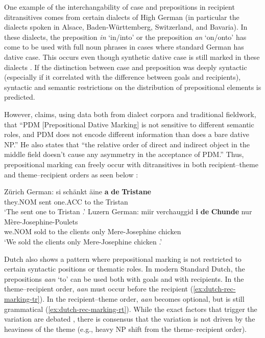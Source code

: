 	One example of the interchangability of case and prepositions in recipient ditransitives comes from certain dialects of High German (in particular the dialects spoken in Alsace, Baden-Württemberg, Switzerland, and Bavaria). In these dialects, the preposition \textit{in} `in/into' or the preposition \textit{an} `on/onto' has come to be used with full noun phrases in cases where standard German has dative case. This occurs even though synthetic dative case is still marked in these dialects \citep{Seiler.2001,Seiler.2003}. If the distinction between case and preposition was deeply syntactic (especially if it correlated with the difference between goals and recipients), syntactic and semantic restrictions on the distribution of prepositional elements is predicted. 
	
	However, \cite{Seiler.2001} claims, using data both from dialect corpora and traditional fieldwork, that ``PDM [Prepositional Dative Marking] is not sensitive to different semantic roles, and PDM does not encode different information than does a bare dative NP.'' He also states that ``the relative order of direct and indirect object in the middle field doesn't cause any asymmetry in the acceptance of PDM.'' Thus, prepositional marking can freely occur with ditransitives in both recipient--theme and theme--recipient orders as seen below \citep{Seiler.2001,Seiler.2003}:
	\begin{exe}
		\ex Zürich German:\label{ex:zurich}
		\gll si schänkt äine \textbf{a} \textbf{de} \textbf{Tristane}\\
		they.NOM sent one.ACC to the Tristan\\
		\trans `The sent one to Tristan \citep[pg. 175]{Seiler.2003}.'
		\ex Luzern German:\label{ex:luzern}
		\gll miir verchauggid \textbf{i} \textbf{de} \textbf{Chunde} nur Mère-Josephine-Poulets\\
		we.NOM sold to the clients only Mere-Josephine chicken\\
		`We sold the clients only Mere-Josephine chicken \citep[pg. 175]{Seiler.2003}.'

	\end{exe}
	Dutch also shows a pattern where prepositional marking is not restricted to certain syntactic positions or thematic roles. In modern Standard Dutch, the prepositions \textit{aan} `to' can be used both with goals and with recipients. In the theme--recipient order, \textit{aan} must occur before the recipient (\ref{ex:dutch-rec-marking-tr}). In the recipient--theme order, \textit{aan} becomes optional, but is still grammatical (\ref{ex:dutch-rec-marking-rt}). While the exact factors that trigger the variation are debated \citep{vanBelle.1996b,Colleman.2010b}, there is consensus that the variation is not driven by the heaviness of the theme (e.g., heavy NP shift from the theme--recipient order). 
